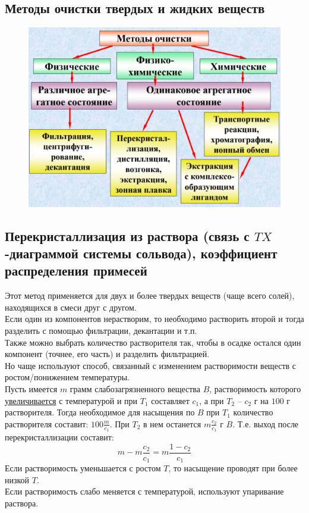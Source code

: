 \documentclass[14pt,a4paper]{scrartcl}
\begin{document}
\subsection*{Методы очистки твердых и жидких веществ}
\begin{figure}[H]
	\centering
	\includegraphics[scale=0.6]{methods}
	\caption{}
	\label{}
\end{figure}
\subsection*{Перекристаллизация из раствора (связь с $TX$-диаграммой системы сольвода), коэффициент распределения примесей}
Этот метод применяется для двух и более твердых веществ (чаще всего солей), находящихся в смеси друг с другом. \\
Если один из компонентов нерастворим, то необходимо растворить второй и тогда разделить с помощью фильтрации, декантации и т.п. \\
Также можно выбрать количество растворителя так, чтобы в осадке остался один компонент (точнее, его часть) и разделить фильтрацией. \\
Но чаще используют способ, связанный с изменением растворимости веществ с ростом/понижением температуры. \\
Пусть имеется $m$ грамм слабозагрязненного вещества $B$, растворимость которого \ul{увеличивается} с температурой и при $T_1$ составляет $c_1$, а при $T_2$ -- $c_2$ г на $100$ г растворителя. Тогда необходимое для насыщения по $B$ при $T_1$ количество растворителя составит: $100 \frac{m}{c_1}$. При $T_2$ в нем останется $m\frac{c_2}{c_1}$ г $B$. Т.е. выход после перекристаллизации составит:
$$ m - m\dfrac{c_2}{c_1} = m\dfrac{1-c_2}{c_1} $$
Если растворимость уменьшается с ростом $T$, то насыщение проводят при более низкой $T$. \\
Если растворимость слабо меняется с температурой, используют упаривание раствора.\\
\end{document}
